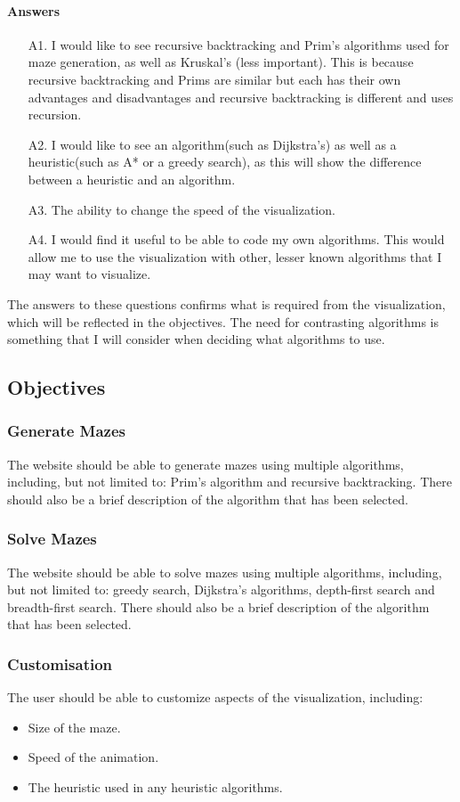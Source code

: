 \documentclass[titlepage]{article}
\begin{document}
\paragraph*{Answers}
\begin{enumerate}
    \item[A1.]I would like to see recursive backtracking and Prim's algorithms used for maze generation, as well as Kruskal's (less important). This is because recursive backtracking and Prims are similar but each has their own advantages and disadvantages and recursive backtracking is different and uses recursion.
    \item[A2.]I would like to see an algorithm(such as Dijkstra's) as well as a heuristic(such as A* or a greedy search), as this will show the difference between a heuristic and an algorithm.
    \item[A3.]The ability to change the speed of the visualization.
    \item[A4.]I would find it useful to be able to code my own algorithms. This would allow me to use the visualization with other, lesser known algorithms that I may want to visualize.
\end{enumerate}
The answers to these questions confirms what is required from the visualization, which will be reflected in the objectives. The need for contrasting algorithms is something that I will consider when deciding what algorithms to use.
\subsection{Objectives}
\subsubsection{Generate Mazes}
The website should be able to generate mazes using multiple algorithms, including, but not limited to: Prim's algorithm and recursive backtracking. There should also be a brief description of the algorithm that has been selected.

\subsubsection{Solve Mazes}
The website should be able to solve mazes using multiple algorithms, including, but not limited to: greedy search, Dijkstra's algorithms, depth-first search and breadth-first search. There should also be a brief description of the algorithm that has been selected.

\subsubsection{Customisation}
The user should be able to customize aspects of the visualization, including:
\begin{itemize}
    \item Size of the maze.
    \item Speed of the animation.
    \item The heuristic used in any heuristic algorithms.
\end{itemize}
\end{document}
